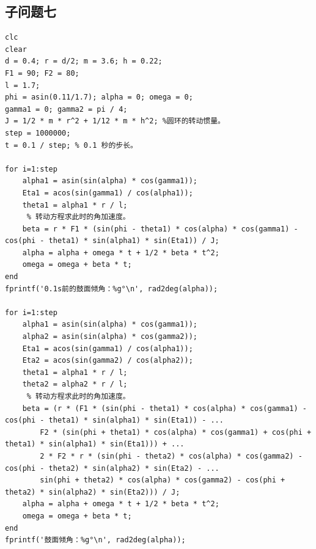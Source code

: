 \documentclass{cumcm}
\begin{document}
\subsection{子问题七}
\begin{lstlisting}
clc
clear
d = 0.4; r = d/2; m = 3.6; h = 0.22;
F1 = 90; F2 = 80;
l = 1.7;
phi = asin(0.11/1.7); alpha = 0; omega = 0;
gamma1 = 0; gamma2 = pi / 4;
J = 1/2 * m * r^2 + 1/12 * m * h^2; %圆环的转动惯量。
step = 1000000;
t = 0.1 / step; % 0.1 秒的步长。

for i=1:step
    alpha1 = asin(sin(alpha) * cos(gamma1));
    Eta1 = acos(sin(gamma1) / cos(alpha1));
    theta1 = alpha1 * r / l;
     % 转动方程求此时的角加速度。
    beta = r * F1 * (sin(phi - theta1) * cos(alpha) * cos(gamma1) - cos(phi - theta1) * sin(alpha1) * sin(Eta1)) / J;
    alpha = alpha + omega * t + 1/2 * beta * t^2;
    omega = omega + beta * t;
end
fprintf('0.1s前的鼓面倾角：%g°\n', rad2deg(alpha));

for i=1:step
    alpha1 = asin(sin(alpha) * cos(gamma1));
    alpha2 = asin(sin(alpha) * cos(gamma2));
    Eta1 = acos(sin(gamma1) / cos(alpha1));
    Eta2 = acos(sin(gamma2) / cos(alpha2));
    theta1 = alpha1 * r / l;
    theta2 = alpha2 * r / l;
     % 转动方程求此时的角加速度。
    beta = (r * (F1 * (sin(phi - theta1) * cos(alpha) * cos(gamma1) - cos(phi - theta1) * sin(alpha1) * sin(Eta1)) - ...
        F2 * (sin(phi + theta1) * cos(alpha) * cos(gamma1) + cos(phi + theta1) * sin(alpha1) * sin(Eta1))) + ...
        2 * F2 * r * (sin(phi - theta2) * cos(alpha) * cos(gamma2) - cos(phi - theta2) * sin(alpha2) * sin(Eta2) - ...
        sin(phi + theta2) * cos(alpha) * cos(gamma2) - cos(phi + theta2) * sin(alpha2) * sin(Eta2))) / J;
    alpha = alpha + omega * t + 1/2 * beta * t^2;
    omega = omega + beta * t;
end
fprintf('鼓面倾角：%g°\n', rad2deg(alpha));
\end{lstlisting}
\end{document}
